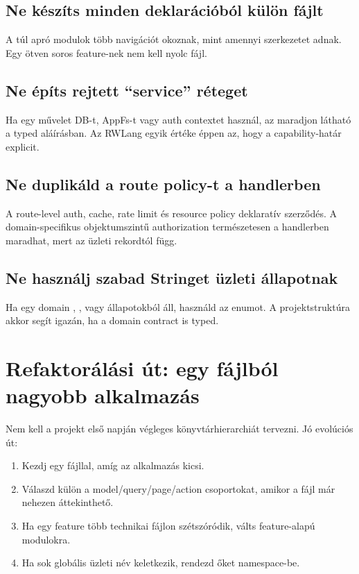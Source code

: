 \subsection*{Ne készíts minden deklarációból külön fájlt}

A túl apró modulok több navigációt okoznak, mint amennyi szerkezetet adnak. Egy ötven soros feature-nek nem kell nyolc fájl.

\subsection*{Ne építs rejtett ``service'' réteget}

Ha egy művelet DB-t, AppFs-t vagy auth contextet használ, az maradjon látható a typed aláírásban. Az RWLang egyik értéke éppen az, hogy a capability-határ explicit.

\subsection*{Ne duplikáld a route policy-t a handlerben}

A route-level auth, cache, rate limit és resource policy deklaratív szerződés. A domain-specifikus objektumszintű authorization természetesen a handlerben maradhat, mert az üzleti rekordtól függ.

\subsection*{Ne használj szabad Stringet üzleti állapotnak}

Ha egy domain , ,  vagy  állapotokból áll, használd az enumot. A projektstruktúra akkor segít igazán, ha a domain contract is typed.

\section{Refaktorálási út: egy fájlból nagyobb alkalmazás}

Nem kell a projekt első napján végleges könyvtárhierarchiát tervezni. Jó evolúciós út:

\begin{enumerate}
  \item Kezdj egy  fájllal, amíg az alkalmazás kicsi.
  \item Válaszd külön a model/query/page/action csoportokat, amikor a fájl már nehezen áttekinthető.
  \item Ha egy feature több technikai fájlon szétszóródik, válts feature-alapú modulokra.
  \item Ha sok globális üzleti név keletkezik, rendezd őket  namespace-be.
\end{enumerate}
